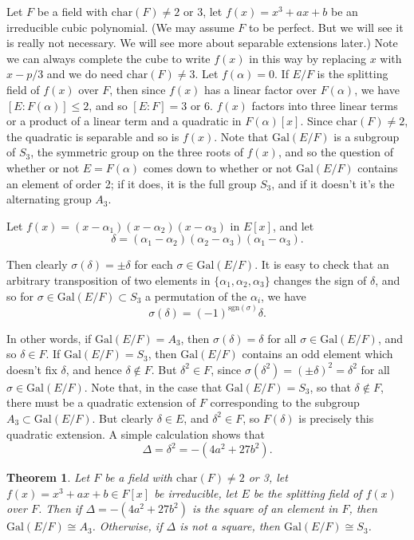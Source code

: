 \documentclass[12pt]{report}
\newtheorem{thm}{Theorem}[section]
\theoremstyle{definition}
\def\sgn{\text{sgn}}
\def\aa{\alpha}
\def\Gal{\text{Gal}}
\def\char{\text{char}}
\begin{document}
Let $F$ be a field with $\char(F) \not= 2$ or 3, let $f(x) = x^3 + ax + b$ be an irreducible cubic polynomial. (We may assume $F$ to be perfect. But we will see it is really not necessary. We will see more about separable extensions later.) Note we can always complete the cube to write $f(x)$ in this way by replacing $x$ with $x-p/3$ and we do need $\char(F)\not=3$. Let $f(\aa) = 0$. If $E/F$ is the splitting field of $f(x)$ over $F$, then since $f(x)$ has a linear factor over $F(\aa)$, we have $[E : F(\aa)] \leq 2$, and so $[E : F] = 3$ or 6. $f(x)$ factors into three linear terms or a product of a linear term and a quadratic in $F(\aa)[x]$. Since $\char(F) \not= 2$, the quadratic is separable and so is $f(x)$. Note that $\Gal(E/F)$ is a subgroup of $S_3$, the symmetric group on the three roots of $f(x)$, and so the question of whether or not $E = F(\aa)$ comes down to whether or not $\Gal(E/F)$ contains an element of order 2; if it does, it is the full group $S_3$, and if it doesn't it's the alternating group $A_3$.


Let $f(x) = (x - \aa_1)(x - \aa_2)(x - \aa_3)$ in $E[x]$, and let
$$\delta = (\aa_1 - \aa_2)(\aa_2 - \aa_3)(\aa_1 - \aa_3).$$

Then clearly $\sigma(\delta) = \pm\delta$ for each $\sigma \in \Gal(E/F)$. It is easy to check that an arbitrary transposition of two elements in $\{\aa_1, \aa_2, \aa_3\}$ changes the sign of $\delta$, and so for $\sigma \in \Gal(E/F) \subset S_3$ a permutation of the $\aa_i$, we have
$$\sigma(\delta) = (-1)^{\sgn(\sigma)} \delta.$$

In other words, if $\Gal(E/F) =A_3$, then $\sigma(\delta) = \delta$ for all $\sigma\in \Gal(E/F)$, and so $\delta\in F$. If $\Gal(E/F) = S_3$, then $\Gal(E/F)$ contains an odd element which doesn't fix $\delta$, and hence $\delta \notin F$. But $\delta^2\in F$, since $\sigma(\delta^2) = (\pm\delta)^2 =\delta^2$ for all $\sigma\in \Gal(E/F)$. Note that, in the case that $\Gal(E/F) = S_3$, so that $\delta \notin F$, there must be a quadratic extension of $F$ corresponding to the subgroup $A_3 \subset \Gal(E/F)$. But clearly $\delta\in E$, and $\delta^2\in F$, so $F(\delta)$ is precisely this quadratic extension. A simple calculation shows that $$\Delta =\delta^2 =  -(4a^2+27b^2).$$

\begin{thm}
    Let $F$ be a field with $\char(F) \not= 2$ or 3, let $f(x) = x^3+ax+b\in F[x]$  be irreducible, let $E$ be the splitting field of $f(x)$ over $F$. Then if $\Delta = -(4a^2+27b^2)$ is the square of an element in $F$, then $\Gal(E/F) \cong A_3$. Otherwise, if $\Delta$ is not a square, then $\Gal(E/F) \cong S_3$.
\end{thm}
\end{document}
